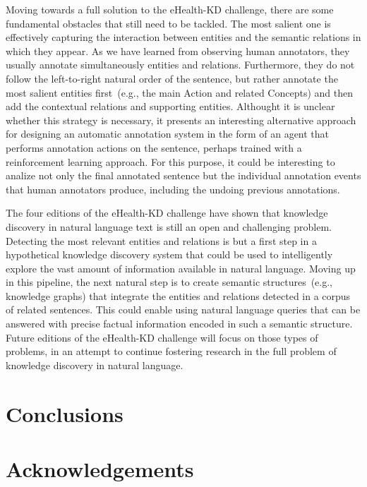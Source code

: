 \documentclass[a4paper,11pt,twocolumn,twoside]{article}
\begin{document}
Moving towards a full solution to the eHealth-KD challenge, there are some fundamental obstacles that still need to be tackled.
The most salient one is effectively capturing the interaction between entities and the semantic relations in which they appear.
As we have learned from observing human annotators, they usually annotate simultaneously entities and relations.
Furthermore, they do not follow the left-to-right natural order of the sentence, but rather annotate the most salient entities first~(e.g., the main Action and related Concepts) and then add the contextual relations and supporting entities.
Althought it is unclear whether this strategy is necessary, it presents an interesting alternative approach for designing an automatic annotation system in the form of an agent that performs annotation actions on the sentence, perhaps trained with a reinforcement learning approach.
For this purpose, it could be interesting to analize not only the final annotated sentence but the individual annotation events that human annotators produce, including the undoing previous annotations.

The four editions of the eHealth-KD challenge have shown that knowledge discovery in natural language text is still an open and challenging problem.
Detecting the most relevant entities and relations is but a first step in a hypothetical knowledge discovery system that could be used to intelligently explore the vast amount of information available in natural language.
Moving up in this pipeline, the next natural step is to create semantic structures~(e.g., knowledge graphs) that integrate the entities and relations detected in a corpus of related sentences.
This could enable using natural language queries that can be answered with precise factual information encoded in such a semantic structure.
Future editions of the eHealth-KD challenge will focus on those types of problems, in an attempt to continue fostering research in the full problem of knowledge discovery in natural language.

\section{Conclusions}\label{sec:conclusions}

\section*{Acknowledgements}



\end{document}

